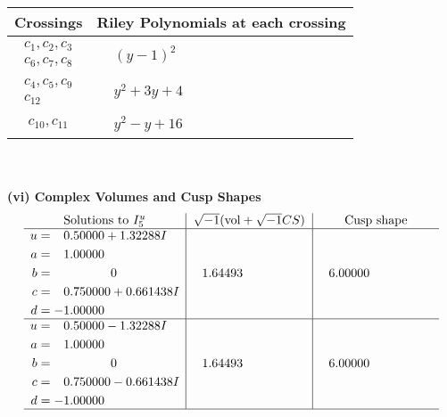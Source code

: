 \documentclass[1p]{elsarticle_modified}
\theoremstyle{definition}
\newcommand{\I}{\sqrt{-1}}
\begin{document}
\begin{tabular}{m{50pt}|m{274pt}}
Crossings & \hspace{64pt}Riley Polynomials at each crossing \\
\hline $$\begin{aligned}c_{1},c_{2},c_{3}\\c_{6},c_{7},c_{8}\end{aligned}$$&$\begin{aligned}
&(y-1)^2
\end{aligned}$\\
\hline $$\begin{aligned}c_{4},c_{5},c_{9}\\c_{12}\end{aligned}$$&$\begin{aligned}
&y^2+3 y+4
\end{aligned}$\\
\hline $$\begin{aligned}c_{10},c_{11}\end{aligned}$$&$\begin{aligned}
&y^2- y+16
\end{aligned}$\\
\hline
\end{tabular}\\~\\
\newpage\flushleft \textbf{(vi) Complex Volumes and Cusp Shapes}
$$\begin{array}{c|c|c}  
\text{Solutions to }I^u_{5}& \I (\text{vol} + \sqrt{-1}CS) & \text{Cusp shape}\\
 \hline 
\begin{aligned}
u &= \phantom{-}0.50000 + 1.32288 I \\
a &= \phantom{-}1.00000\phantom{ +0.000000I} \\
b &= \phantom{-0.000000 } 0 \\
c &= \phantom{-}0.750000 + 0.661438 I \\
d &= -1.00000\phantom{ +0.000000I}\end{aligned}
 & \phantom{-}1.64493\phantom{ +0.000000I} & \phantom{-}6.00000\phantom{ +0.000000I} \\ \hline\begin{aligned}
u &= \phantom{-}0.50000 - 1.32288 I \\
a &= \phantom{-}1.00000\phantom{ +0.000000I} \\
b &= \phantom{-0.000000 } 0 \\
c &= \phantom{-}0.750000 - 0.661438 I \\
d &= -1.00000\phantom{ +0.000000I}\end{aligned}
 & \phantom{-}1.64493\phantom{ +0.000000I} & \phantom{-}6.00000\phantom{ +0.000000I}\\
 \hline 
 \end{array}$$\newpage\newpage\renewcommand{\arraystretch}{1}
\end{document}
